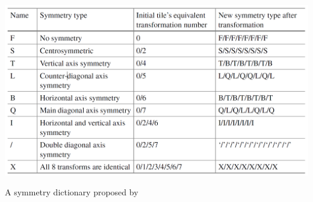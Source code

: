 \begin{table}[H]
    \centering
    \includegraphics[width=\textwidth, height=0.3\textheight, keepaspectratio]{Images/SymmetryDictionary.png}
    \caption{A symmetry dictionary proposed by \cite{WFC_Automatic_Rules_And_Better_Symmetries}}
    \label{fig:symmetryDictionary}
\end{table}

